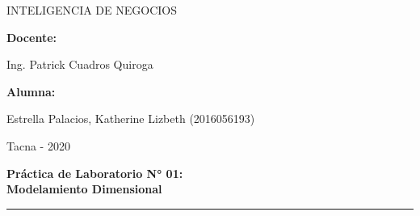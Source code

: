 \documentclass[12pt,letterpaper]{article}
\begin{document}
\begin{titlepage}
\begin{center}
	\vspace*{0.1in}
	\begin{large}
	INTELIGENCIA DE NEGOCIOS\\
	\end{large}
	
	\vspace*{0.3in}
	\begin{Large}
	\textbf{Docente:} \\
	\end{Large}
	
	\vspace*{0.1in}
	\begin{large}
	 Ing. Patrick Cuadros Quiroga\\
	\end{large}
	
	\vspace*{0.2in}
	\vspace*{0.1in}
	\begin{large}
	\textbf{Alumna:} \\
	\begin{flushleft}
	Estrella Palacios, Katherine Lizbeth	\hfill	(2016056193) 
	\end{flushleft}
	\end{large}

	\vspace*{0.5in}
	\begin{large}
	 Tacna - 2020\\
	\end{large}



	\end{center}

\end{titlepage}

\thispagestyle{empty} %
\newpage
\setcounter{page}{1} %

\begin{center}
\begin{LARGE}
	\textbf{Práctica de Laboratorio N° 01: \\ Modelamiento Dimensional} \\ 
\end{LARGE}
\rule{110mm}{0.1mm}
\end{center}



\end{document}

